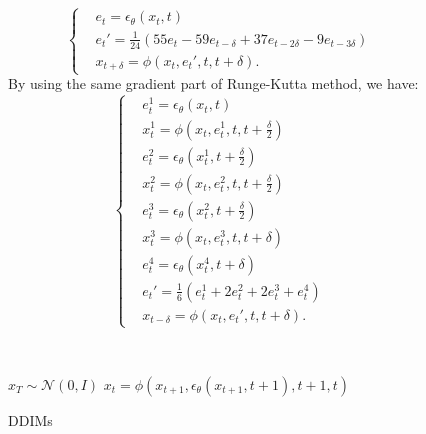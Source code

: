 \documentclass{article}
\begin{document}
\begin{figure}[h]
   \vspace*{-0.2cm}
   \begin{minipage}[t]{0.54\linewidth}
      \vspace*{-0.1cm}
      \begin{equation}
         \begin{cases}
            &e_t = \epsilon_\theta(x_t, t)\\
            &e_t' = \frac{1}{24}(55e_t-59e_{t-\delta}+37e_{t-2\delta}-9e_{t-3\delta}) \\
            &x_{t+\delta} = \phi(x_t, e_t', t, t+\delta).
         \end{cases}
         \label{one_order}
      \end{equation}
      By using the same gradient part of Runge-Kutta method, we have:
      \begin{equation}
         \begin{cases}
            & e_t^1 = \epsilon_\theta(x_t, t)\\
            & x_t^1 = \phi(x_t, e_t^1, t, t+\frac{\delta}{2}) \\
            & e_t^2 = \epsilon_\theta(x_t^1, t+\frac{\delta}{2})\\
            & x_t^2 = \phi(x_t, e_t^2, t, t+\frac{\delta}{2}) \\
            & e_t^3 = \epsilon_\theta(x_t^2, t+\frac{\delta}{2})\\
            & x_t^3 = \phi(x_t, e_t^3, t, t+\delta) \\
            & e_t^4 = \epsilon_\theta(x_t^4, t+\delta)\\
            & e_t' = \frac{1}{6}(e_t^1+2e_t^2+2e_t^3+e_t^4) \\
            & x_{t-\delta} = \phi(x_t, e_t', t, t+\delta).
         \end{cases}
         \label{four_order}
      \end{equation}
   \end{minipage}
   \ \ 
   \vspace*{-\baselineskip}
   \begin{minipage}[t]{0.43\linewidth}
      \vspace*{-0.2cm}
      \begin{algorithm}[H]
         \small
         \caption{DDIMs}
         \label{origin_alg}
         \begin{algorithmic}[1]
            \STATE $x_T \sim \mathcal{N}(0, I)$
               \STATE $x_t = \phi(x_{t+1}, \epsilon_\theta(x_{t+1}, t+1), t+1, t)$ \\

\end{algorithmic}
\end{algorithm}
\end{minipage}
\end{figure}
\end{document}
